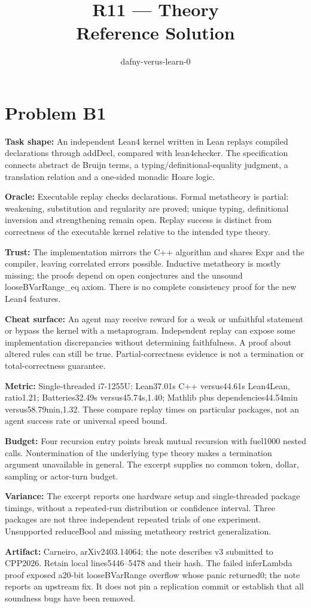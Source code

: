 \documentclass[11pt]{article}
\title{R11 --- Theory \\ \large Reference Solution}
\author{dafny-verus-learn-0}
\date{}
\begin{document}
\maketitle
\section*{Problem B1}\label{ans:B1}
\begin{answer}
\textbf{Task shape:} An independent Lean4 kernel written in Lean replays compiled declarations through addDecl, compared with lean4checker. The specification connects abstract de Bruijn terms, a typing/definitional-equality judgment, a translation relation and a one-sided monadic Hoare logic.

\textbf{Oracle:} Executable replay checks declarations. Formal metatheory is partial: weakening, substitution and regularity are proved; unique typing, definitional inversion and strengthening remain open. Replay success is distinct from correctness of the executable kernel relative to the intended type theory.

\textbf{Trust:} The implementation mirrors the C++ algorithm and shares Expr and the compiler, leaving correlated errors possible. Inductive metatheory is mostly missing; the proofs depend on open conjectures and the unsound looseBVarRange\_eq axiom. There is no complete consistency proof for the new Lean4 features.

\textbf{Cheat surface:} An agent may receive reward for a weak or unfaithful statement or bypass the kernel with a metaprogram. Independent replay can expose some implementation discrepancies without determining faithfulness. A proof about altered rules can still be true. Partial-correctness evidence is not a termination or total-correctness guarantee.

\textbf{Metric:} Single-threaded i7-1255U: Lean37.01s C++ versus44.61s Lean4Lean, ratio1.21; Batteries32.49s versus45.74s,1.40; Mathlib plus dependencies44.54min versus58.79min,1.32. These compare replay times on particular packages, not an agent success rate or universal speed bound.

\textbf{Budget:} Four recursion entry points break mutual recursion with fuel1000 nested calls. Nontermination of the underlying type theory makes a termination argument unavailable in general. The excerpt supplies no common token, dollar, sampling or actor-turn budget.

\textbf{Variance:} The excerpt reports one hardware setup and single-threaded package timings, without a repeated-run distribution or confidence interval. Three packages are not three independent repeated trials of one experiment. Unsupported reduceBool and missing metatheory restrict generalization.

\textbf{Artifact:} Carneiro, arXiv2403.14064; the note describes v3 submitted to CPP2026. Retain local lines5446--5478 and their hash. The failed inferLambda proof exposed a20-bit looseBVarRange overflow whose panic returned0; the note reports an upstream fix. It does not pin a replication commit or establish that all soundness bugs have been removed.
\end{answer}
\end{document}
